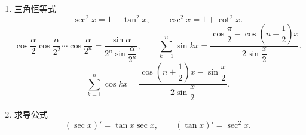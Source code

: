 \begin{theorem}
\begin{enumerate}[label=\arabic*.]
\[                  \qquad
                  \cos\alpha=\dfrac{1-\tan^2\dfrac{\alpha}{2}}{1+\tan^2\dfrac{\alpha}{2}}.
              \]
        \item 三角恒等式
              \[
                  \sec^2x=1+\tan^2x,
                  \qquad
                  \csc^2x=1+\cot^2x.
              \]
              \[
                  \cos\dfrac{\alpha}{2}\cos\dfrac{\alpha}{2^2}\cdots
                  \cos\dfrac{\alpha}{2^n}
                  =\dfrac{\sin\alpha}{2^n\sin\dfrac{\alpha}{2^n}},
                  \qquad
                  \sum\limits_{k=1}^n\sin kx
                  =\dfrac{\cos\dfrac{\pi}{2}-\cos\left(n+\dfrac{1}{2}\right)x}
                  {2\sin\dfrac{x}{2}}.
              \]
              \[
                  \displaystyle\sum\limits_{k=1}^n\cos kx
                  =\dfrac{\cos\left(n+\dfrac{1}{2}\right)x-\sin\dfrac{x}{2}}
                  {2\sin\dfrac{x}{2}}.
              \]
        \item 求导公式
              \[
                  (\sec x)'=\tan x\sec x,
                  \qquad
                  (\tan x)'=\sec^2x.
              \]
    \end{enumerate}
\end{theorem}

